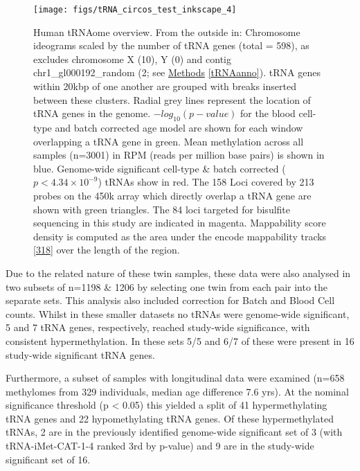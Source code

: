 \documentclass[
]{book}
\begin{document}
\begin{figure}

{\centering \texttt{[image: figs/tRNA\_circos\_test\_inkscape\_4]} 

}

\caption{Human tRNAome overview. From the outside in: Chromosome ideograms scaled by the number of tRNA genes (total = 598), as excludes chromosome X (10), Y (0) and contig chr1\_gl000192\_random (2; see \protect\hyperlink{tRNAanno}{Methods} \ref{tRNAanno}). tRNA genes within 20kbp of one another are grouped with breaks inserted between these clusters. Radial grey lines represent the location of tRNA genes in the genome. \(-log_{10}(p-value)\) for the blood cell-type and batch corrected age model are shown for each window overlapping a tRNA gene in green. Mean methylation across all samples (n=3001) in RPM (reads per million base pairs) is shown in blue. Genome-wide significant cell-type \& batch corrected (\(p < 4.34\times10^{-9}\)) tRNAs show in red. The 158 Loci covered by 213 probes on the 450k array which directly overlap a tRNA gene are shown with green triangles. The 84 loci targeted for bisulfite sequencing in this study are indicated in magenta. Mappability score density is computed as the area under the encode mappability tracks {[}\protect\hyperlink{ref-Derrien2012}{318}{]} over the length of the region.}\label{fig:circos}
\end{figure}



Due to the related nature of these twin samples, these data were also analysed in two subsets of n=1198 \& 1206 by selecting one twin from each pair into the separate sets.
This analysis also included correction for Batch and Blood Cell counts.
Whilst in these smaller datasets no tRNAs were genome-wide significant, 5 and 7 tRNA genes, respectively, reached study-wide significance, with consistent hypermethylation.
In these sets 5/5 and 6/7 of these were present in 16 study-wide significant tRNA genes.

Furthermore, a subset of samples with longitudinal data were examined (n=658 methylomes from 329 individuals, median age difference 7.6 yrs).
At the nominal significance threshold (p \textless{} 0.05) this yielded a split of 41 hypermethylating tRNA genes and 22 hypomethylating tRNA genes.
Of these hypermethylated tRNAs, 2 are in the previously identified genome-wide significant set of 3 (with tRNA-iMet-CAT-1-4 ranked 3rd by p-value) and 9 are in the study-wide significant set of 16.
\end{document}
